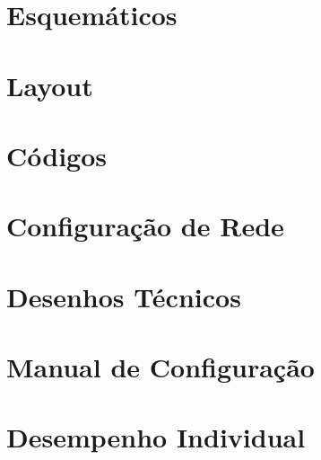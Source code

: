\begin{anexosenv}

\partanexos

\chapter{Esquemáticos}


\chapter{Layout}


\chapter{Códigos}

\chapter{Configuração de Rede}



\chapter{Desenhos Técnicos}

\chapter{Manual de Configuração}


\chapter{Desempenho Individual}


\end{anexosenv}

